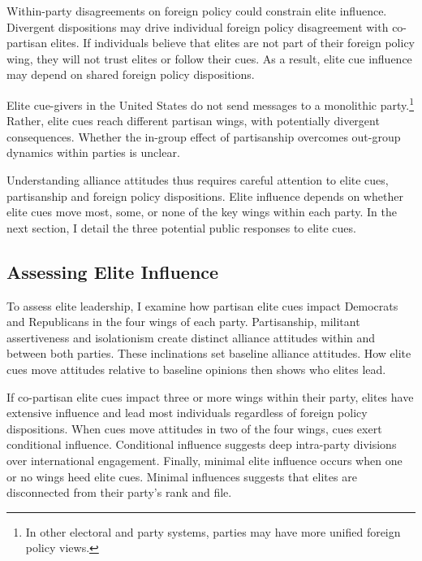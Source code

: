 \documentclass[12pt]{article}
\begin{document}


Within-party disagreements on foreign policy could constrain elite influence. 
Divergent dispositions may drive individual foreign policy disagreement with co-partisan elites.
If individuals believe that elites are not part of their foreign policy wing, they will not trust elites or follow their cues. 
As a result, elite cue influence may depend on shared foreign policy dispositions.


Elite cue-givers in the United States do not send messages to a monolithic party.\footnote{In other electoral and party systems, parties may have more unified foreign policy views.}
Rather, elite cues reach different partisan wings, with potentially divergent consequences. 
Whether the in-group effect of partisanship overcomes out-group dynamics within parties is unclear. 


Understanding alliance attitudes thus requires careful attention to elite cues, partisanship and foreign policy dispositions. 
Elite influence depends on whether elite cues move most, some, or none of the key wings within each party. 
In the next section, I detail the three potential public responses to elite cues. 




\subsection{Assessing Elite Influence}


To assess elite leadership, I examine how partisan elite cues impact Democrats and Republicans in the four wings of each party.
Partisanship, militant assertiveness and isolationism create distinct alliance attitudes within and between both parties. 
These inclinations set baseline alliance attitudes. 
How elite cues move attitudes relative to baseline opinions then shows who elites lead. 


If co-partisan elite cues impact three or more wings within their party, elites have extensive influence and lead most individuals regardless of foreign policy dispositions. 
When cues move attitudes in two of the four wings, cues exert conditional influence. 
Conditional influence suggests deep intra-party divisions over international engagement. 
Finally, minimal elite influence occurs when one or no wings heed elite cues.
Minimal influences suggests that elites are disconnected from their party's rank and file.
\end{document}
